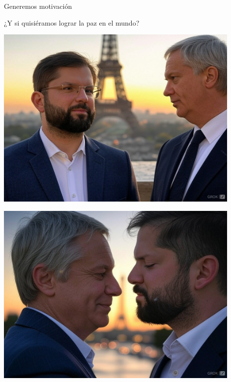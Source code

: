 \documentclass[aspectratio=169,xcolor=dvipsnames, t, spanish]{beamer}
\begin{document}
\begin{frame}{Generemos motivación}
\begin{center}
    ¿Y si quisiéramos lograr la paz en el mundo?
    \pause
\end{center}
    \begin{minipage}{0.5\textwidth}
        \includegraphics[width=0.9\textwidth]{figures/BoricKast.jpeg}
        \pause
    \end{minipage}\begin{minipage}{0.5\textwidth}
        \includegraphics[width=0.9\textwidth]{figures/BoricKastBeso.jpeg}
    \end{minipage}
\end{frame}
\end{document}
